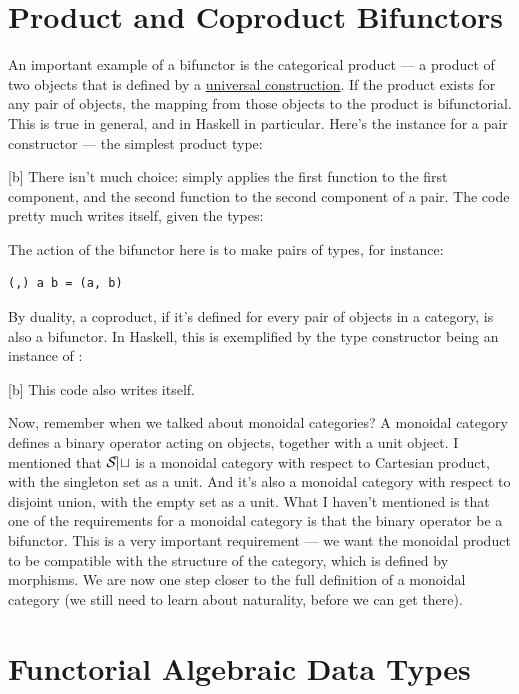 \section{Product and Coproduct Bifunctors}

An important example of a bifunctor is the categorical product --- a
product of two objects that is defined by a \hyperref[products-and-coproducts]{universal
construction}. If the product exists for any pair of objects, the
mapping from those objects to the product is bifunctorial. This is true
in general, and in Haskell in particular. Here's the 
instance for a pair constructor --- the simplest product type:

[b]
There isn't much choice:  simply applies the first
function to the first component, and the second function to the second
component of a pair. The code pretty much writes itself, given the
types:

The action of the bifunctor here is to make pairs of types, for
instance:

\begin{Verbatim}
(,) a b = (a, b)
\end{Verbatim}
By duality, a coproduct, if it's defined for every pair of objects in a
category, is also a bifunctor. In Haskell, this is exemplified by the
 type constructor being an instance of
:

[b]
This code also writes itself.

Now, remember when we talked about monoidal categories? A monoidal
category defines a binary operator acting on objects, together with a
unit object. I mentioned that $\mathcal{S\mkern-3mu et}$ is a monoidal category with
respect to Cartesian product, with the singleton set as a unit. And it's
also a monoidal category with respect to disjoint union, with the empty
set as a unit. What I haven't mentioned is that one of the requirements
for a monoidal category is that the binary operator be a bifunctor. This
is a very important requirement --- we want the monoidal product to be
compatible with the structure of the category, which is defined by
morphisms. We are now one step closer to the full definition of a
monoidal category (we still need to learn about naturality, before we
can get there).

\section{Functorial Algebraic Data Types}

